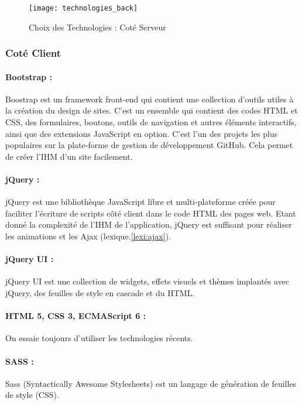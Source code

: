 \begin{figure}[ht]
 \centering
 \texttt{[image: technologies\_back]}
 \caption{Choix des Technologies : Coté Serveur}
 \label{fig:technologies_back}
\end{figure}

\subsubsection{Coté Client}

\paragraph{Bootstrap :}
Boostrap est un framework front-end qui contient une collection d'outils utiles à la création du design de sites.
C'est un ensemble qui contient des codes HTML et CSS, des formulaires, boutons, outils de navigation et autres éléments interactifs, ainsi que des extensions JavaScript en option. C'est l'un des projets les plus populaires sur la plate-forme de gestion de développement GitHub.
Cela permet de créer l'IHM d'un site facilement.

\paragraph{jQuery :}
jQuery est une bibliothèque JavaScript libre et multi-plateforme créée pour faciliter l'écriture de scripts côté client dans le code HTML des pages web.
Etant donné la complexité de l'IHM de l'application, jQuery est suffisant pour réaliser les animations et les Ajax (lexique.\ref{lexi:ajax}).

\paragraph{jQuery UI :}
jQuery UI est une collection de widgets, effets visuels et thèmes implantés avec jQuery, des feuilles de style en cascade et du HTML.

\paragraph{HTML 5, CSS 3, ECMAScript 6 :}
On essaie toujours d'utiliser les technologies récents.

\paragraph{SASS :}
Sass (Syntactically Awesome Stylesheets) est un langage de génération de feuilles de style (CSS).

